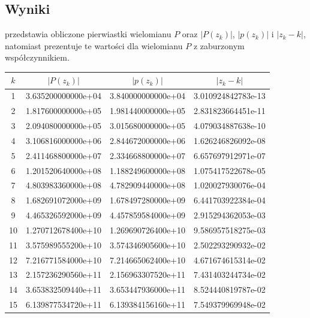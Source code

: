 \documentclass[11pt]{mk-polish-lab-report}
\begin{document}
\subsection{Wyniki}

 przedstawia obliczone pierwiastki wielomianu $P$ oraz $|P(z_k)|$, $|p(z_k)|$ i $|z_k-k|$, natomiast  prezentuje te wartości dla wielomianu $P$ z zaburzonym współczynnikiem.

\begin{table}[!h]
        \centering
        \footnotesize
\begin{tabular}{c
		|S[
        table-number-alignment = right,
		table-figures-integer  = 1,
		table-figures-decimal = 12,
		table-figures-exponent=2
		]
		|S[
        table-number-alignment = right,
		table-figures-integer  = 1,
		table-figures-decimal = 12,
		table-figures-exponent=2
		]
		|S[
        table-number-alignment = right,
		table-figures-integer  = 1,
		table-figures-decimal = 12,
		table-figures-exponent=2
		]}
{$k$} & {$|P(z_k)|$} & {$|p(z_k)|$} & {$|z_k-k|$} \\ &3.635200000000e+04&3.840000000000e+04&3.010924842783e-13 \\
2&1.817600000000e+05&1.981440000000e+05&2.831823664451e-11 \\
3&2.094080000000e+05&3.015680000000e+05&4.079034887638e-10 \\
4&3.106816000000e+06&2.844672000000e+06&1.626246826092e-08 \\
5&2.411468800000e+07&2.334668800000e+07&6.657697912971e-07 \\
6&1.201520640000e+08&1.188249600000e+08&1.075417522678e-05 \\
7&4.803983360000e+08&4.782909440000e+08&1.020027930076e-04 \\
8&1.682691072000e+09&1.678497280000e+09&6.441703922384e-04 \\
9&4.465326592000e+09&4.457859584000e+09&2.915294362053e-03 \\
10&1.270712678400e+10&1.269690726400e+10&9.586957518275e-03 \\
11&3.575989555200e+10&3.574346905600e+10&2.502293290932e-02 \\
12&7.216771584000e+10&7.214665062400e+10&4.671674615314e-02 \\
13&2.157236290560e+11&2.156963307520e+11&7.431403244734e-02 \\
14&3.653832509440e+11&3.653447936000e+11&8.524440819787e-02 \\
15&6.139877534720e+11&6.139384156160e+11&7.549379969948e-02 \\

\end{tabular}
\end{table}
\end{document}
